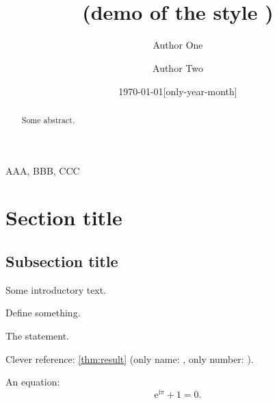\documentclass[a4paper, 11pt,
  use style = classicthesis,
  theorem in new line,
  emphasize theorems,
  theorem numbering = section,
  simple name,  %
  name in link, %
]{einfart}
\numberwithin{equation}{section}
\begin{document}
\title{\\[.3\baselineskip](demo of the style )}
\author{Author One}
\address{Address of Author One}
\author{Author Two}
\address{Address of Author Two}
\date{\today[only-year-month]}

\maketitle

\begin{abstract}
    Some abstract. \blindtext
\end{abstract}

\begin{keyword}
    AAA, BBB, CCC
\end{keyword}

\tableofcontents

\section{Section title}

\subsection{Subsection title}

Some introductory text.

\begin{definition}[something]
    Define something.
\end{definition}

\begin{theorem}\label{thm:result}
    The statement.
\end{theorem}

\begin{emphasis}
    Clever reference: \cref{thm:result} (only name: , only number: ).
\end{emphasis}

An equation:
\begin{equation}\label{eq:Euler}
    \mathrm{e}^{\mathrm{i}\pi} + 1 = 0.
\end{equation}
\end{document}
